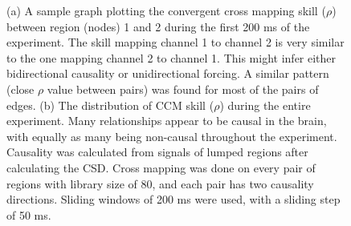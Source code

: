 \begin{figure}[H]
\begin{subfigure}{0.45\textwidth}
    \caption{}
    \label{fig:rho_hist_all_experiment}
  \end{subfigure}
  \caption{(a) A sample graph plotting the convergent cross mapping skill ($\rho$) between region (nodes) 1 and 2 during the first 200 ms of the experiment. The skill mapping channel 1 to channel 2 is very similar to the one mapping channel 2 to channel 1. This might infer either bidirectional causality or unidirectional forcing. A similar pattern (close $\rho$ value between pairs) was found for most of the pairs of edges. (b) The distribution of CCM skill ($\rho$) during the entire experiment. Many relationships appear to be causal in the brain, with equally as many being non-causal throughout the experiment. Causality was calculated from signals of lumped regions after calculating the CSD. Cross mapping was done on every pair of regions with library size of 80, and each pair has two causality directions. Sliding windows of 200 ms were used, with a sliding step of 50 ms.}
\end{figure}


